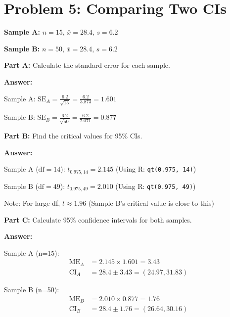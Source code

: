 \documentclass[11pt]{article}
\begin{document}
\newpage

\section{Problem 5: Comparing Two CIs}

\textbf{Sample A:} $n = 15$, $\bar{x} = 28.4$, $s = 6.2$

\textbf{Sample B:} $n = 50$, $\bar{x} = 28.4$, $s = 6.2$

\vspace{6pt}

\textbf{Part A:} Calculate the standard error for each sample.

\textcolor{answergreen}{\textbf{Answer:}}

Sample A: $\text{SE}_A = \frac{6.2}{\sqrt{15}} = \frac{6.2}{3.873} = 1.601$

Sample B: $\text{SE}_B = \frac{6.2}{\sqrt{50}} = \frac{6.2}{7.071} = 0.877$

\vspace{6pt}

\textbf{Part B:} Find the critical values for 95\% CIs.

\textcolor{answergreen}{\textbf{Answer:}}

Sample A ($\text{df} = 14$): $t_{0.975, 14} = 2.145$ (Using R: \texttt{qt(0.975, 14)})

Sample B ($\text{df} = 49$): $t_{0.975, 49} = 2.010$ (Using R: \texttt{qt(0.975, 49)})

Note: For large df, $t \approx 1.96$ (Sample B's critical value is close to this)

\vspace{6pt}

\textbf{Part C:} Calculate 95\% confidence intervals for both samples.

\textcolor{answergreen}{\textbf{Answer:}}

Sample A (n=15):
\begin{align*}
\text{ME}_A &= 2.145 \times 1.601 = 3.43\\
\text{CI}_A &= 28.4 \pm 3.43 = (24.97, 31.83)
\end{align*}

Sample B (n=50):
\begin{align*}
\text{ME}_B &= 2.010 \times 0.877 = 1.76\\
\text{CI}_B &= 28.4 \pm 1.76 = (26.64, 30.16)
\end{align*}

\vspace{6pt}
\end{document}
